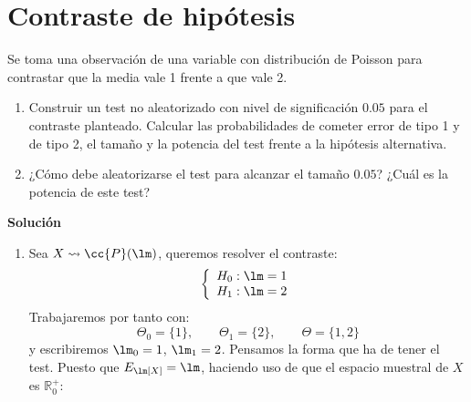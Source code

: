 \section{Contraste de hipótesis}


\begin{ejercicio}
    Se toma una observación de una variable con distribución de Poisson para contrastar que la media vale 1 frente a que vale 2.
    \begin{enumerate}[label=\alph*)]
        \item Construir un test no aleatorizado con nivel de significación $0.05$ para el contraste planteado. Calcular las probabilidades de cometer error de tipo 1 y de tipo 2, el tamaño y la potencia del test frente a la hipótesis alternativa.
        \item ¿Cómo debe aleatorizarse el test para alcanzar el tamaño $0.05$? ¿Cuál es la potencia de este test?
    \end{enumerate}
    
    \textbf{Solución}
    \begin{enumerate}[label=\alph*)]
        \item Sea $X\rightsquigarrow \cc{P}(\lm)$, queremos resolver el contraste:
            \begin{equation*}
                \left\{\begin{array}{l}
                    H_0 : \lm = 1 \\
                    H_1 : \lm = 2
                \end{array}\right.
            \end{equation*}
            Trabajaremos por tanto con:
            \begin{equation*}
                \Theta_0 = \{1\}, \qquad \Theta_1 = \{2\}, \qquad \Theta = \{1,2\}
            \end{equation*}
            y escribiremos $\lm_0 = 1$, $\lm_1 = 2$. Pensamos la forma que ha de tener el test. Puesto que $E_\lm[X]=\lm$, haciendo uso de que el espacio muestral de $X$ es $\mathbb{R}^+_0$:
            \begin{figure}[H]
                \centering
\end{figure}
\end{enumerate}
\end{ejercicio}
